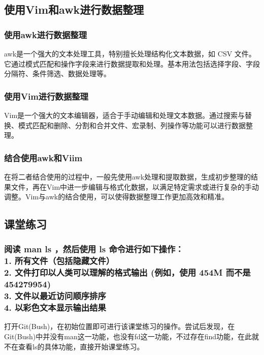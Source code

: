 \documentclass[UTF8,a4paper]{ctexart}
\begin{document}
\begin{sloppypar}
	\subsection{使用Vim和awk进行数据整理}
	\subsubsection{使用awk进行数据整理}
	awk是一个强大的文本处理工具，特别擅长处理结构化文本数据，如 CSV 文件。它通过模式匹配和操作字段来进行数据提取和处理。基本用法包括选择字段、字段分隔符、条件筛选、数据处理等。
	\subsubsection{使用Vim进行数据整理}
	Vim是一个强大的文本编辑器，适合于手动编辑和处理文本数据。通过搜索与替换、模式匹配和删除、分割和合并文件、宏录制、列操作等功能可以进行数据整理。
	\subsubsection{结合使用awk和Viim}
	在将二者结合使用的过程中，一般先使用awk处理和提取数据，生成初步整理的结果文件，再在Vim中进一步编辑与格式化数据，以满足特定需求或进行复杂的手动调整。Vim与awk的结合使用，可以使得数据整理工作更加高效和精准。
	\subsection{课堂练习}
	\graphicspath{{figure/}}
	\subsubsection{阅读 man ls ，然后使用 ls 命令进行如下操作：
		\\1. 所有文件（包括隐藏文件）
		\\2. 文件打印以人类可以理解的格式输出 (例如，使用 454M 而不是 454279954)
		\\3. 文件以最近访问顺序排序
		\\4. 以彩色文本显示输出结果}
	
	\bigskip
	\bigskip
	\bigskip
	\bigskip
	
	打开Git(Bush)，在初始位置即可进行该课堂练习的操作。尝试后发现，在Git(Bush)中并没有man这一功能，也没有fd这一功能，不过存在find功能，在此就不在查看ls的具体功能，直接开始课堂练习。
	

\end{sloppypar}
\end{document}
